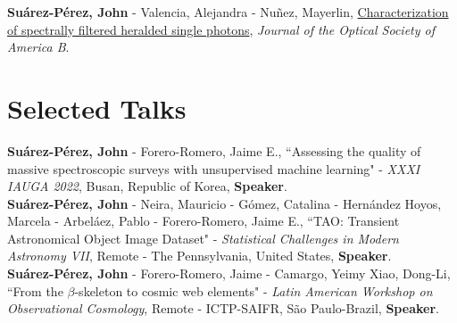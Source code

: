 \documentclass[10pt, a4paper]{article}
\newcommand{\years}[1]{\marginnote{\scriptsize #1}}
\begin{document}
\years{2020}\textbf{Suárez-Pérez, John} - Valencia, Alejandra - Nuñez, Mayerlin, \href{https://doi.org/10.1364/JOSAB.387118}{Characterization of spectrally filtered heralded single photons}, \emph{Journal of the Optical Society of America B}.


\section*{Selected Talks}

\years{2022}\textbf{Suárez-Pérez, John} - Forero-Romero, Jaime E., “Assessing the quality of massive spectroscopic surveys with unsupervised machine learning" - \emph{XXXI IAUGA 2022},  Busan, Republic of Korea, \textbf{Speaker}.\\


\years{2021}\textbf{Suárez-Pérez, John} - Neira, Mauricio - Gómez, Catalina - Hernández Hoyos, Marcela - Arbeláez, Pablo - Forero-Romero, Jaime E., “TAO: Transient Astronomical Object Image Dataset" - \emph{Statistical Challenges in Modern Astronomy VII}, Remote - The Pennsylvania, United States, \textbf{Speaker}.\\ 


\years{2020}\textbf{Suárez-Pérez, John} - Forero-Romero, Jaime - Camargo, Yeimy  Xiao, Dong-Li, “From the $\beta$-skeleton to cosmic web elements" - \emph{Latin American Workshop on Observational Cosmology}, Remote - ICTP-SAIFR, São Paulo-Brazil, \textbf{Speaker}.\\
\end{document}
